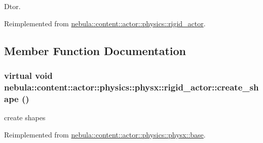 Dtor. 

Reimplemented from \hyperlink{classnebula_1_1content_1_1actor_1_1physics_1_1rigid__actor_a74b433a56d708d13309da2d8ab173970}{nebula::content::actor::physics::rigid\_\-actor}.

\subsection{Member Function Documentation}
\hypertarget{classnebula_1_1content_1_1actor_1_1physics_1_1physx_1_1rigid__actor_a8039ad67e392b45cffebcde5ffb37620}{
\subsubsection[{create\_\-shape}]{\setlength{\rightskip}{0pt plus 5cm}virtual void nebula::content::actor::physics::physx::rigid\_\-actor::create\_\-shape ()}}
\label{classnebula_1_1content_1_1actor_1_1physics_1_1physx_1_1rigid__actor_a8039ad67e392b45cffebcde5ffb37620}


create shapes 

Reimplemented from \hyperlink{classnebula_1_1content_1_1actor_1_1physics_1_1physx_1_1base_a1468fd6d256631892912ecec7f236c01}{nebula::content::actor::physics::physx::base}.

